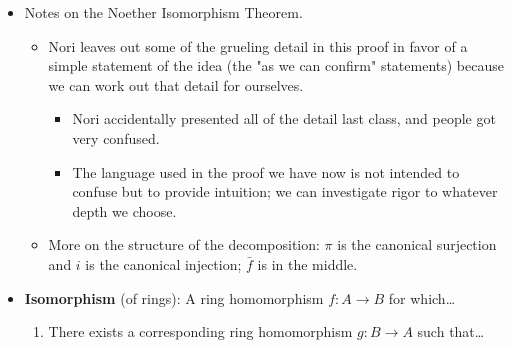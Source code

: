 \documentclass[../notes.tex]{subfiles}
\begin{document}
\begin{itemize}
\begin{proof}
        If we ignore $\times$ and regard $A,B$ as additive abelian groups, the FIT applies and yields the above (unique) factorization. In it, $\bar{f}$ is a bijective additive isomorphism (group homomorphism). Thus, this takes care of proving that $\bar{f}$ respects addition.\par
        We now just need to prove that $\bar{f}$ respects multiplication and sends 1 to 1 to complete our verification that it is a ring homomorphism. We will do this indirectly. First, observe that $f$ is a ring homomorphism and $i$ is a one-to-one ring homomorphism (really; do you mean that $i$ is one-to-one with the subset $f(A)\subset B$ so that defining $i^{-1}\circ f$ makes sense??). Thus, $\bar{f}\circ\pi=i^{-1}\circ f$ is a ring homomorphism (as we can confirm). This combined with the fact that $\pi$ is onto implies that $\bar{f}$ is a ring homomorphism (as we can confirm).\par
        This essentially completes our proof; we just need the formal definition of an isomorphism of rings to take it to the finish line.
    \end{proof}
    \item Notes on the Noether Isomorphism Theorem.
    \begin{itemize}
        \item Nori leaves out some of the grueling detail in this proof in favor of a simple statement of the idea (the "as we can confirm" statements) because we can work out that detail for ourselves.
        \begin{itemize}
            \item Nori accidentally presented all of the detail last class, and people got very confused.
            \item The language used in the proof we have now is not intended to confuse but to provide intuition; we can investigate rigor to whatever depth we choose.
        \end{itemize}
        \item More on the structure of the decomposition: $\pi$ is the canonical surjection and $i$ is the canonical injection; $\bar{f}$ is in the middle.
    \end{itemize}
    \item \textbf{Isomorphism} (of rings): A ring homomorphism $f:A\to B$ for which\dots
    \begin{enumerate}[label={(\roman*)}]
        \item There exists a corresponding ring homomorphism $g:B\to A$ such that\dots

\end{enumerate}
\end{itemize}
\end{document}
